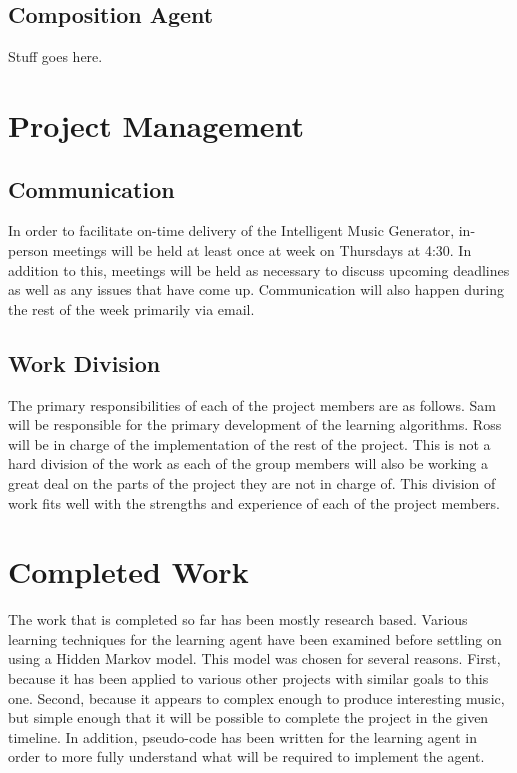 \documentclass{article}
\begin{document}
\subsection{Composition Agent}
Stuff goes here.

\section{Project Management}
\subsection{Communication}
In order to facilitate on-time delivery of the Intelligent Music Generator, in-person meetings will be held at least once at week on Thursdays at 4:30. In addition to this, meetings will be held as necessary to discuss upcoming deadlines as well as any issues that have come up. Communication will also happen during the rest of the week primarily via email.

\subsection{Work Division}
The primary responsibilities of each of the project members are as follows. Sam will be responsible for the primary development of the learning algorithms. Ross will be in charge of the implementation of the rest of the project. This is not a hard division of the work as each of the group members will also be working a great deal on the parts of the project they are not in charge of. This division of work fits well with the strengths and experience of each of the project members.

\section{Completed Work}
The work that is completed so far has been mostly research based. Various learning techniques for the learning agent have been examined before settling on using a Hidden Markov model. This model was chosen for several reasons. First, because it has been applied to various other projects with similar goals to this one. Second, because it appears to complex enough to produce interesting music, but simple enough that it will be possible to complete the project in the given timeline. In addition, pseudo-code has been written for the learning agent in order to more fully understand what will be required to implement the agent.
\end{document}
